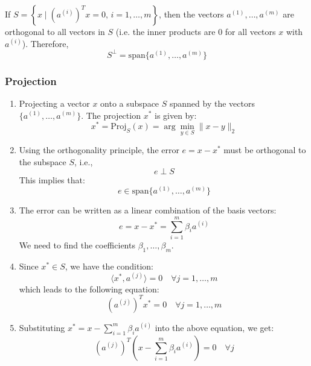     \begin{definition}
        If $S = \left\{ x \mid \left( a^{(i)} \right)^T x = 0, \, i = 1, \dots, m \right\}$, then the vectors \( a^{(1)}, \dots, a^{(m)} \) are orthogonal to all vectors in \( S \) (i.e. the inner products are $0$ for all vectors $x$ with $a^{(i)}$). Therefore,
        \begin{equation}
            S^\perp = \text{span} \{ a^{(1)}, \dots, a^{(m)} \}
        \end{equation}
    \end{definition}

    \subsubsection{Projection}
    \begin{derivation}
        \begin{enumerate}
            \item Projecting a vector $x$ onto a subspace $S$ spanned by the vectors $\{a^{(1)}, \dots, a^{(m)}\}$. 
            The projection $x^*$ is given by:
            \[
            x^* = \text{Proj}_S(x) = \arg \min_{y \in S} \| x - y \|_2
            \]

            \item Using the orthogonality principle, the error $e = x - x^*$ must be orthogonal to the subspace $S$, i.e.,
            \[
            e \perp S
            \]
            This implies that:
            \[
            e \in \text{span}\{a^{(1)}, \dots, a^{(m)}\}
            \]
            
            \item The error can be written as a linear combination of the basis vectors:
            \[
            e = x - x^* = \sum_{i=1}^{m} \beta_i a^{(i)}
            \]
            We need to find the coefficients $\beta_1, \dots, \beta_m$.
            
            \item Since $x^* \in S$, we have the condition:
            \[
            \langle x^*, a^{(j)} \rangle = 0 \quad \forall j = 1, \dots, m
            \]
            which leads to the following equation:
            \[
            (a^{(j)})^T x^* = 0 \quad \forall j = 1, \dots, m
            \]
            
            \item Substituting $x^* = x - \sum_{i=1}^{m} \beta_i a^{(i)}$ into the above equation, we get:
            \[
            (a^{(j)})^T \left( x - \sum_{i=1}^{m} \beta_i a^{(i)} \right) = 0 \quad \forall j
            \]
            

\end{enumerate}
\end{derivation}

